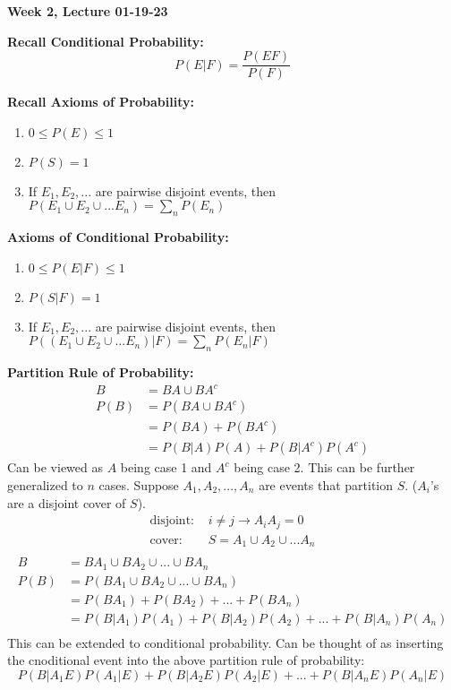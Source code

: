 \documentclass[10pt]{article}
\begin{document}
\begin{center}
	\Large \textbf{Week 2, Lecture 01-19-23}
\end{center}
\normalsize

\begin{flushleft}
    \textbf{Recall Conditional Probability:}
    $$ P(E|F) = \frac{P(EF)}{P(F)} $$
\end{flushleft}

\begin{flushleft}
    \textbf{Recall Axioms of Probability:}
    \begin{enumerate}
        \item $ 0 \leq P(E) \leq 1 $
        \item $ P(S) = 1 $
        \item If $E_1, E_2, ... $ are pairwise disjoint events, then $ P(E_1 \cup
            E_2 \cup ... E_n ) = \sum_n P(E_n) $
    \end{enumerate}
    \textbf{Axioms of Conditional Probability:}
    \begin{enumerate}
        \item $ 0 \leq P(E|F) \leq 1 $
        \item $ P(S|F) = 1 $
        \item If $E_1, E_2, ... $ are pairwise disjoint events, then $ P((E_1 \cup
            E_2 \cup ... E_n)|F) = \sum_n P(E_n|F) $
    \end{enumerate}
    \textbf{Partition Rule of Probability:}
    $$ \begin{aligned} 
        B &= BA \cup BA^c       \\
        P(B) &= P(BA \cup BA^c) \\
             &= P(BA) + P(BA^c) \\
             &= \boxed{P(B|A)P(A) + P(B|A^c)P(A^c)}
    \end{aligned} $$
    Can be viewed as $A$ being case 1 and $A^c$ being case 2. This can be
    further generalized to $n$ cases. Suppose $A_1, A_2, ... , A_n$ are events
    that partition $S$. ($A_i$'s are a disjoint cover of $S$).
    $$ \begin{aligned} 
        \text{disjoint: }& i \neq j \rightarrow A_iA_j = 0 \\
        \text{cover: }& S = A_1 \cup A_2 \cup ... A_n \\
    \end{aligned} $$
    $$ \begin{aligned} 
        B &= BA_1 \cup BA_2 \cup ... \cup BA_n \\
        P(B) &= P(BA_1 \cup BA_2 \cup ... \cup BA_n) \\
             &= P(BA_1) + P(BA_2) + ... + P(BA_n) \\
             &= \boxed{P(B|A_1)P(A_1) + P(B|A_2)P(A_2) + ... + P(B|A_n)P(A_n) }\\
    \end{aligned} $$
    This can be extended to conditional probability. Can be thought of as
    inserting the cnoditional event into the above partition rule of
    probability:
    $$ \boxed{P(B|A_1E)P(A_1|E) + P(B|A_2E)P(A_2|E) + ... + P(B|A_nE)P(A_n|E) }$$


\end{flushleft}
\end{document}
